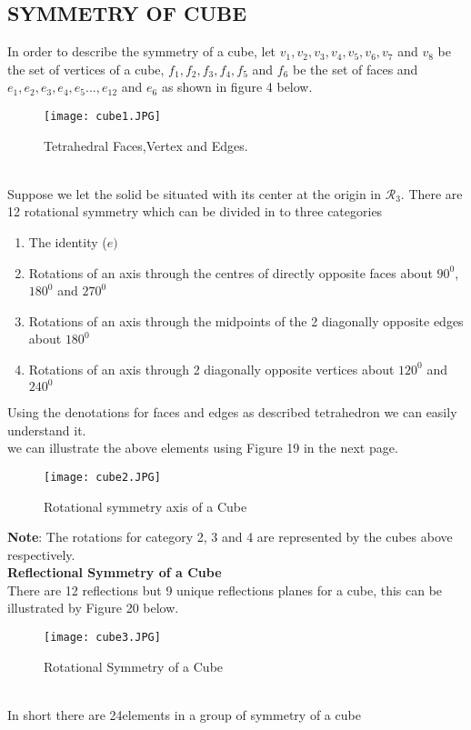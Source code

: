 \documentclass{article}
\begin{document}
\subsection{SYMMETRY OF CUBE}
In order to describe the symmetry of a cube,
 let $v_1, v_2, v_3,v_4,v_5,v_6,v_7$ and $ v_8$ be the set of vertices of a cube, $f_1,f_2,f_3,f_4,f_5$ and $f_6$ be the set of faces and $e_1,e_2,e_3,e_4,e_5...,e_{12}$ and $e_6$ as shown
 in figure 4 below.\\

\begin{figure}[htp]
\texttt{[image: cube1.JPG]}
\caption{Tetrahedral Faces,Vertex and Edges.}
\end{figure}

\\
Suppose we let the solid be situated with its center at the origin in $\mathcal{R}
_3$. There are 12 rotational symmetry which can be divided in to three categories
\begin{enumerate}
    \item The identity ($e)$
    \item  Rotations of an axis through the centres of directly opposite faces about $90^0$, $180^0$ and $270^0$
    \item Rotations of an axis through the midpoints of the 2 diagonally opposite edges about $180^0$
    \item Rotations of an axis through 2 diagonally opposite vertices about $120^0$ and $240^0$
\end{enumerate}

Using the denotations for faces and edges as described tetrahedron we can easily understand it.\\
we can illustrate the above elements using Figure 19 in the next page.\\
\vspace{12cm}

\begin{figure}[htp]
\texttt{[image: cube2.JPG]}
\caption{Rotational symmetry axis of a Cube}
\end{figure}
\textbf{Note}: The rotations for  category 2, 3 and 4 are represented by the cubes above respectively.\\

 \textbf{Reflectional Symmetry of a Cube}\\
 
There are 12 reflections but 9 unique reflections planes for a cube, this can be illustrated by
Figure 20 below.\\
\begin{figure}[htp]
\texttt{[image: cube3.JPG]}
\caption{Rotational Symmetry of a Cube}
\end{figure}\\
In short there are 24elements in a group of symmetry of a cube
\vspace{3cm}
\\
\end{document}
